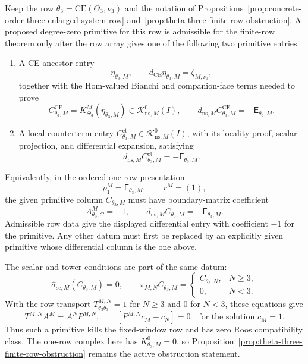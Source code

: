 \begin{prop}\label{prop:theta-three-primitive-entry-criterion}
  Keep the row \(\theta_3=\mathrm{CE}(\Theta_3,\nu_3)\) and the notation of
  Propositions~\ref{prop:concrete-order-three-enlarged-system-row}
  and~\ref{prop:theta-three-finite-row-obstruction}.  A proposed
  degree-zero primitive for this row is admissible for the finite-row
  theorem only after the row array gives one of the following two
  primitive entries.
  \begin{enumerate}[label=(P\arabic*)]
    \item A CE-ancestor entry
      \[
        \eta_{\theta_3,M},\qquad
        d_{\mathrm{CE}}\eta_{\theta_3,M}=\zeta_{M,\nu_3},
      \]
      together with the Hom-valued Bianchi and companion-face terms needed
      to prove
      \[
        C^{\mathrm{CE}}_{\theta_3,M}
          =
        K^M_{\Theta_3}(\eta_{\theta_3,M})
        \in\mathcal K^0_{\mathrm{ns},M}(I),
        \qquad
        d_{\mathrm{ns},M}C^{\mathrm{CE}}_{\theta_3,M}
          =
        -\mathsf E_{\theta_3,M}.
      \]

    \item A local counterterm entry
      \(C^{\mathrm{ct}}_{\theta_3,M}\in
      \mathcal K^0_{\mathrm{ns},M}(I)\), with its locality proof, scalar
      projection, and differential expansion, satisfying
      \[
        d_{\mathrm{ns},M}C^{\mathrm{ct}}_{\theta_3,M}
          =
        -\mathsf E_{\theta_3,M}.
      \]
  \end{enumerate}
  Equivalently, in the ordered one-row presentation
  \[
    \rho^M_1=\mathsf E_{\theta_3,M},\qquad r^M=(1),
  \]
  the given primitive column \(C_{\theta_3,M}\) must have boundary-matrix
  coefficient
  \[
    A^M_{\theta_3,C}=-1,
    \qquad
    d_{\mathrm{ns},M}C_{\theta_3,M}
      =
    -\mathsf E_{\theta_3,M}.
  \]
  Admissible row data give the displayed differential entry
  with coefficient \(-1\) for the primitive.  Any other datum must first
  be replaced by an explicitly given primitive whose differential
  column is the one above.

  The scalar and tower conditions are part of the same datum:
  \[
    \widehat\sigma_{\mathrm{sc},M}(C_{\theta_3,M})=0,
    \qquad
    \pi_{M,N}C_{\theta_3,M}=
    \begin{cases}
      C_{\theta_3,N}, & N\geq3,\\
      0, & N<3.
    \end{cases}
  \]
  With the row transport
  \(T^{M,N}_{\theta_3\theta_3}=1\) for \(N\geq3\) and \(0\) for
  \(N<3\), these equations give
  \[
    T^{M,N}A^M=A^N P^{M,N},
    \qquad
    [P^{M,N}c_M-c_N]=0
    \quad\text{for the solution }c_M=1.
  \]
  Thus such a primitive kills the fixed-window row and has zero Roos
  compatibility class.  The one-row complex here has
  \(K^0_{\theta_3,M}=0\), so
  Proposition~\ref{prop:theta-three-finite-row-obstruction} remains the
  active obstruction statement.


\end{prop}
